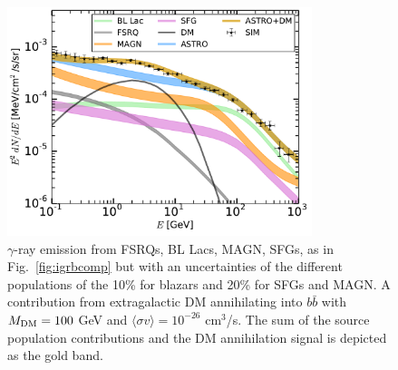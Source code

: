 \documentclass[12 pt]{article}
\begin{document}
\begin{figure} %
 \centering
  \includegraphics[width=3.5in]{money_plot_proposal.pdf} 
\vspace{-0.5cm}
   \caption{$\gamma$-ray emission from FSRQs, BL Lacs, MAGN, SFGs, as in Fig.~\ref{fig:igrbcomp} but with an uncertainties of the different populations of the 10\% for blazars and 20\% for SFGs and MAGN. A contribution from extragalactic DM annihilating into $b\bar{b}$ with $M_{\rm{DM}}=100$ GeV and $\langle \sigma v \rangle = 10^{-26}$ cm$^3$/s. The sum of the source population contributions and the DM annihilation signal is depicted as the gold band.}
   \label{fig:moneyplot}
\end{figure}




\vspace{-0.5cm}
\end{document}
